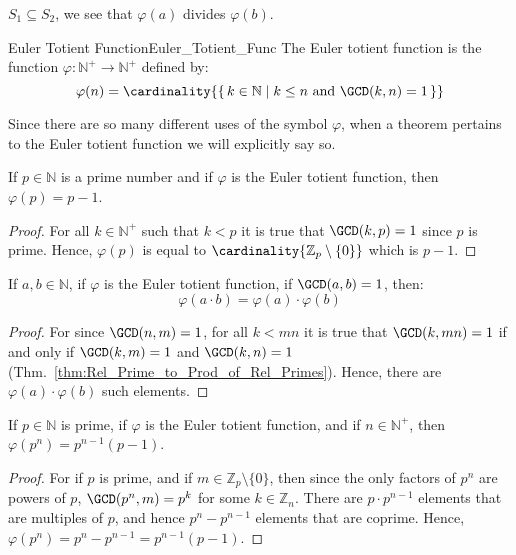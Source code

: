     $S_{1}\subseteq{S}_{2}$, we see that
    $\varphi(a)$ divides $\varphi(b)$.  \begin{fdefinition}{Euler Totient Function}{Euler_Totient_Func}
        The Euler totient function is the function
        $\varphi:\mathbb{N}^{+}\rightarrow\mathbb{N}^{+}$ defined by:
        \begin{equation*}
            \varphi(n)=\cardinality{\{\,k\in\mathbb{N}\;|\;
                k\leq{n}\textrm{ and }\GCD(k,n)=1\,\}}
        \end{equation*}
    \end{fdefinition}
    Since there are so many different uses of the symbol $\varphi$, when
    a theorem pertains to the Euler totient function we will explicitly
    say so.
    \begin{theorem}
        \label{thm:Euler_Totient_of_Prime}%
        If $p\in\mathbb{N}$ is a prime number and if $\varphi$ is the
        Euler totient function, then $\varphi(p)=p-1$.
    \end{theorem}
    \begin{proof}
        For all $k\in\mathbb{N}^{+}$ such that $k<p$ it is true that
        $\GCD(k,p)=1$ since $p$ is prime. Hence, $\varphi(p)$ is equal
        to $\cardinality{\mathbb{Z}_{p}\setminus\{0\}}$ which  is $p-1$.
    \end{proof}
    \begin{theorem}
        \label{thm:Euler_Totient_Multiplicative}%
        If $a,b\in\mathbb{N}$, if $\varphi$ is the Euler totient
        function, if $\GCD(a,b)=1$, then:
        \begin{equation}
            \varphi(a\cdot{b})=\varphi(a)\cdot\varphi(b)
        \end{equation}
    \end{theorem}
    \begin{proof}
        For since $\GCD(n,m)=1$, for all $k<mn$ it is true that
        $\GCD(k,mn)=1$ if and only if $\GCD(k,m)=1$ and $\GCD(k,n)=1$
        (Thm.~\ref{thm:Rel_Prime_to_Prod_of_Rel_Primes}). Hence, there
        are $\varphi(a)\cdot\varphi(b)$ such elements.
    \end{proof}
    \begin{theorem}
        \label{thm:Euler_Totient_Powers_of_Primes}%
        If $p\in\mathbb{N}$ is prime, if $\varphi$ is the Euler totient
        function, and if $n\in\mathbb{N}^{+}$, then
        $\varphi(p^{n})=p^{n-1}(p-1)$.
    \end{theorem}
    \begin{proof}
        For if $p$ is prime, and if $m\in\mathbb{Z}_{p}\setminus\{0\}$,
        then since the only factors of $p^{n}$ are powers of $p$,
        $\GCD(p^{n},m)=p^{k}$ for some $k\in\mathbb{Z}_{n}$. There are
        $p\cdot{p}^{n-1}$ elements that are multiples of $p$, and hence
        $p^{n}-p^{n-1}$ elements that are coprime. Hence,
        $\varphi(p^{n})=p^{n}-p^{n-1}=p^{n-1}(p-1)$.
    \end{proof}
